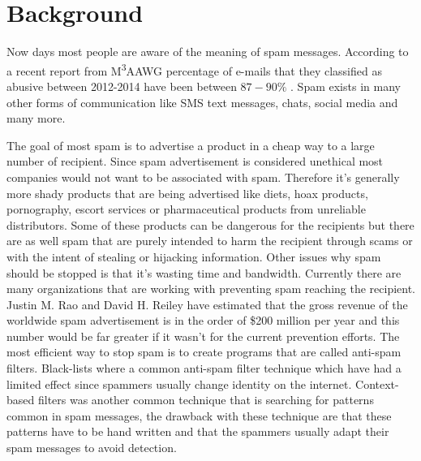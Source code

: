 \section{Background}
Now days most people are aware of the meaning of spam messages. According to a recent report from M\textsuperscript{3}AAWG percentage of e-mails that they classified as abusive between 2012-2014 have been between $87-90\%$ \cite{M3AAWG2014}. Spam exists in many other forms of communication like SMS text messages, chats, social media and many more.

The goal of most spam is to advertise a product in a cheap way to a large number of recipient. Since spam advertisement is considered unethical most companies would not want to be associated with spam. Therefore it's generally more shady products that are being advertised like diets, hoax products, pornography, escort services or pharmaceutical products from unreliable distributors.
Some of these products can be dangerous for the recipients but there are as well spam that are purely intended to harm the recipient through scams or with the intent of stealing or hijacking information.
Other issues why spam should be stopped is that it's wasting time and bandwidth. 
Currently there are many organizations that are working with preventing spam reaching the recipient.
Justin M. Rao and David H. Reiley \cite{rao2012economics} have estimated that the gross revenue of the worldwide spam advertisement is in the order of \$200 million per year and this number would be far greater if it wasn't for the current prevention efforts.
The most efficient way to stop spam is to create programs that are called anti-spam filters. 
Black-lists where a common anti-spam filter technique which have had a limited effect since spammers usually change identity on the internet.
Context-based filters was another common technique that is searching for patterns common in spam messages, the drawback with these technique are that these patterns have to be hand written and that the spammers usually adapt their spam messages to avoid detection. 